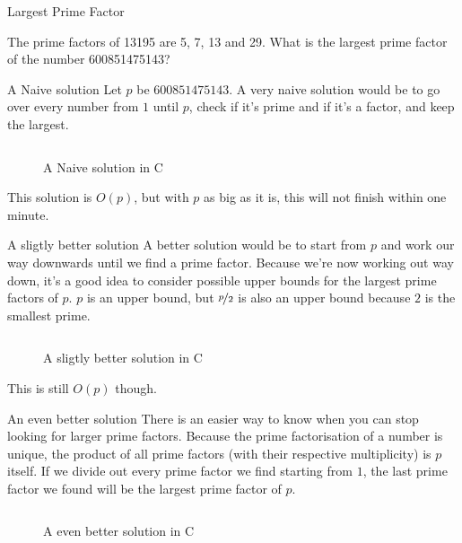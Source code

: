\documentclass[main.tex]{subfiles}
\begin{document}
\begin{prob}{3}{Largest Prime Factor}
  \begin{problem}
    The prime factors of 13195 are 5, 7, 13 and 29.
    What is the largest prime factor of the number 600851475143?
  \end{problem}

  \begin{solutions}
    \begin{solution}{A Naive solution}
      Let $p$ be $600851475143$.
      A very naive solution would be to go over every number from $1$ until $p$, check if it's prime and if it's a factor, and keep the largest.
      \begin{figure}[H]
        \inputminted[firstline=19, lastline=28]{c}{\sol{003}{c}/naive.c}
        \caption{A Naive solution in C}
      \end{figure}
      This solution is $O(p)$, but with $p$ as big as it is, this will not finish within one minute.
    \end{solution}

    \begin{solution}{A sligtly better solution}
      A better solution would be to start from $p$ and work our way downwards until we find a prime factor.
      Because we're now working out way down, it's a good idea to consider possible upper bounds for the largest prime factors of $p$.
      $p$ is an upper bound, but $\nicefrac{p}{2}$ is also an upper bound because $2$ is the smallest prime.
      \begin{figure}[H]
        \inputminted[firstline=17, lastline=25]{c}{\sol{003}{c}/better.c}
        \caption{A sligtly better solution in C}
      \end{figure}
      This is still $O(p)$ though.
    \end{solution}

    \begin{solution}{An even better solution}
      There is an easier way to know when you can stop looking for larger prime factors.
      Because the prime factorisation of a number is unique, the product of all prime factors (with their respective multiplicity) is $p$ itself.
      If we divide out every prime factor we find starting from $1$, the last prime factor we found will be the largest prime factor of $p$.

      \begin{figure}[H]
        \inputminted[firstline=19, lastline=29]{c}{\sol{003}{c}/solution.c}
        \caption{A even better solution in C}
      \end{figure}
    \end{solution}
  \end{solutions}
\end{prob}
\end{document}
